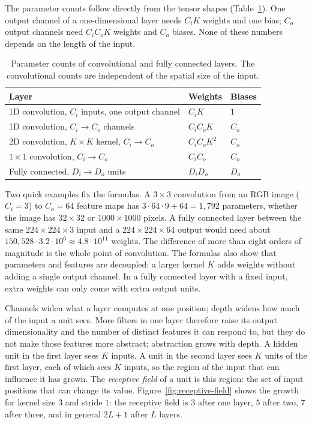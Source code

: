 The parameter counts follow directly from the tensor shapes
(Table~\ref{tab:conv-params}). One output channel of a one-dimensional layer
needs $C_i K$ weights and one bias; $C_o$ output channels need $C_i C_o K$
weights and $C_o$ biases. None of these numbers depends on the length of the
input.

\begin{table}[ht]
  \centering
  \begin{tabular}{@{}lll@{}}
    \toprule
    Layer & Weights & Biases \\
    \midrule
    1D convolution, $C_i$ inputs, one output channel & $C_i K$ & $1$ \\
    1D convolution, $C_i \rightarrow C_o$ channels & $C_i C_o K$ & $C_o$ \\
    2D convolution, $K\times K$ kernel, $C_i \rightarrow C_o$ &
      $C_i C_o K^2$ & $C_o$ \\
    $1\times1$ convolution, $C_i \rightarrow C_o$ & $C_i C_o$ & $C_o$ \\
    Fully connected, $D_i \rightarrow D_o$ units & $D_i D_o$ & $D_o$ \\
    \bottomrule
  \end{tabular}
  \caption{Parameter counts of convolutional and fully connected layers. The
  convolutional counts are independent of the spatial size of the input.}
  \label{tab:conv-params}
\end{table}

\noindent
Two quick examples fix the formulas. A $3\times3$ convolution from an RGB image
($C_i = 3$) to $C_o = 64$ feature maps has $3\cdot64\cdot9 + 64 = 1{,}792$
parameters, whether the image has $32\times32$ or $1000\times1000$ pixels. A
fully connected layer between the same $224\times224\times3$ input and a
$224\times224\times64$ output would need about $150{,}528\cdot3.2\cdot10^6
\approx 4.8\cdot10^{11}$ weights. The difference of more than eight orders of
magnitude is the whole point of convolution. The formulas also show that
parameters and features are decoupled: a larger kernel $K$ adds weights without
adding a single output channel. In a fully connected layer with a fixed input,
extra weights can only come with extra output units.

Channels widen what a layer computes at one position; depth widens how much of
the input a unit sees. More filters in one layer therefore raise its output
dimensionality and the number of distinct features it can respond to, but they
do not make those features more abstract; abstraction grows with depth. A hidden unit in the first layer sees $K$ inputs. A unit in the second layer sees
$K$ units of the first layer, each of which sees $K$ inputs, so the region of
the input that can influence it has grown. The \emph{receptive field} of a unit is
this region: the set of input positions that can change its value.
Figure~\ref{fig:receptive-field} shows the growth for kernel size $3$ and stride
$1$: the receptive field is $3$ after one layer, $5$ after two, $7$ after three,
and in general $2L+1$ after $L$ layers.

